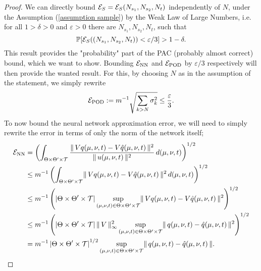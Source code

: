 \begin{proof}
    We can directly bound $\mathcal{E}_S = \mathcal{E}_S(N_{s_1}, N_{s_2}, N_t)$ independently of $N$, under the Assumption (\ref{assumption sample})
    by the Weak Law of Large Numbers, i.e. for all $1 > \delta > 0$ and $\varepsilon > 0$ there are $N_{s_1}, N_{s_2}, N_t$, such that
    \begin{equation} \label{eq: bound on S error pod-dl-rom}
        \mathbb{P}[\mathcal{E}_S((N_{s_1}, N_{s_2}, N_t)) < \varepsilon / 3] > 1 - \delta.
    \end{equation}
    This result provides the "probability" part of the PAC (probably almost correct) bound, which we want to show. Bounding $\mathcal{E}_{\text{NN}}$ and $\mathcal{E}_{\text{POD}}$
    by $\varepsilon / 3$ respectively will then provide the wanted result. For this, by choosing $N$ as in the assumption of the statement,
    we simply rewrite
    \begin{equation} \label{eq: bound on POD error pod-dl-rom}
        \mathcal{E}_{\text{POD}} := m^{-1} \sqrt{\sum_{k > N} \sigma_k^2} \leq \frac{\varepsilon}{3}.
    \end{equation}
    To now bound the neural network approximation error, we will need to simply rewrite the error in terms of only the 
    norm of the network itself;
    \begin{equation} \label{eq:nn error for pod-dl-rom}
        \begin{aligned}
            \mathcal{E}_{\text{NN}} &= \left( \int_{\Theta \times \Theta' \times \mathcal{T}} 
            \frac{\lVert \, V q(\mu, \nu, t) - V \hat{q}(\mu, \nu, t) \, \rVert^2}{\lVert \, u(\mu, \nu, t) \, \rVert^2}
            \, d(\mu, \nu, t) \right)^{1/2} \\
            &\leq m^{-1} \left( \int_{\Theta \times \Theta' \times \mathcal{T}} 
            \lVert \, V q(\mu, \nu, t) - V \hat{q}(\mu, \nu, t) \, \rVert^2 \, d(\mu, \nu, t) \right)^{1/2} \\
            &\leq m^{-1} \left( \left| \Theta \times \Theta' \times \mathcal{T} \right| 
            \sup_{(\mu, \nu, t) \in \Theta \times \Theta' \times \mathcal{T}} 
            \lVert \, V q(\mu, \nu, t) - V \hat{q}(\mu, \nu, t) \, \rVert^2 \right)^{1/2} \\
            &\leq m^{-1} \left( \left| \Theta \times \Theta' \times \mathcal{T} \right| \lVert \, V \, \rVert_\infty^2 
            \sup_{(\mu, \nu, t) \in \Theta \times \Theta' \times \mathcal{T}} 
            \lVert \, q(\mu, \nu, t) - \hat{q}(\mu, \nu, t) \, \rVert^2 \right)^{1/2} \\
            &= m^{-1} \left| \Theta \times \Theta' \times \mathcal{T} \right|^{1/2} 
            \sup_{(\mu, \nu, t) \in \Theta \times \Theta' \times \mathcal{T}} 
            \lVert \, q(\mu, \nu, t) - \hat{q}(\mu, \nu, t) \, \rVert.
        \end{aligned}
        \end{equation}
        

\end{proof}
